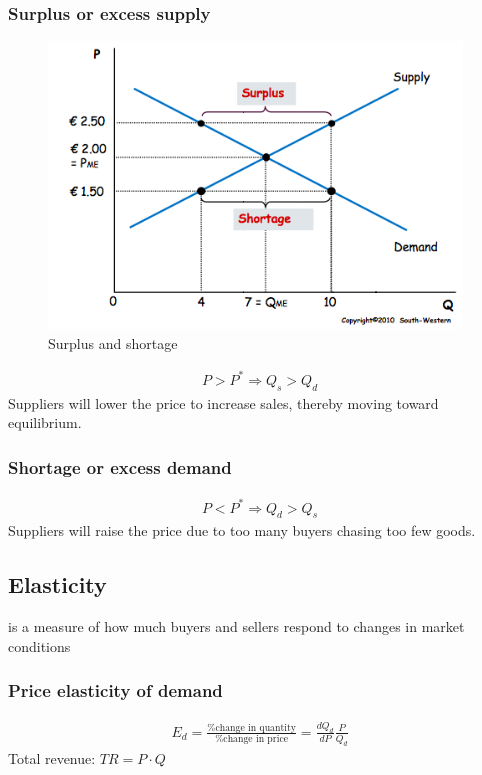 \documentclass[a4paper,titlepage] {scrartcl}
\begin{document}
\subsubsection{Surplus or excess supply}
\begin{figure}[htbp]
	\centering
		\includegraphics[height=3in]{images/surplusshortage.png}
	\caption{Surplus and shortage}
	\label{fig:images_surplusshortage}
\end{figure}

\begin{eqnarray*}
	P>P^* \Rightarrow Q_s >Q_d 
\end{eqnarray*}
Suppliers will lower the price to increase sales, thereby moving toward equilibrium. 
\subsubsection{Shortage or excess demand}
\begin{eqnarray*}
	P<P^* \Rightarrow Q_d > Q_s
\end{eqnarray*}
Suppliers will raise the price due to too many buyers chasing too few goods.

\subsection{Elasticity}
is a measure of how much buyers and sellers respond to changes in market conditions

\subsubsection{Price elasticity of demand}
\begin{eqnarray*}
	E_d=\frac{\text{\% change in quantity}}{\text{\% change in price}}=
	\frac{dQ_d}{dP}\frac{P}{Q_d}
\end{eqnarray*}
Total revenue: $TR = P \cdot Q$
\end{document}

